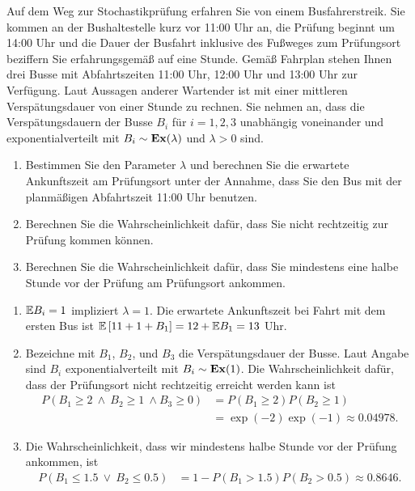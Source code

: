  Auf dem Weg zur Stochastikprüfung erfahren Sie von
einem Busfahrerstreik. Sie kommen an der Bushaltestelle kurz vor 11:00 Uhr an,
die Prüfung beginnt um 14:00 Uhr und die Dauer der Busfahrt inklusive des
Fußweges zum Prüfungsort beziffern Sie erfahrungsgemäß auf eine Stunde. Gemäß
Fahrplan stehen Ihnen drei Busse mit Abfahrtszeiten 11:00 Uhr, 12:00 Uhr und 13:00 Uhr zur
Verfügung. Laut Aussagen anderer Wartender ist mit einer mittleren
Verspätungsdauer von einer Stunde zu rechnen. Sie nehmen an, dass die
Verspätungsdauern der Busse $B_i$  f\"ur $i=1,2,3$ unabhängig voneinander und exponentialverteilt mit $B_i \sim \mathbf{Ex}(\lambda)$ und
$\lambda>0$ sind. 
\begin{enumerate}
    \item Bestimmen Sie den Parameter $\lambda$ und berechnen Sie die erwartete
        Ankunftszeit am Prüfungsort unter der Annahme, dass Sie den Bus mit der
        planmäßigen Abfahrtszeit 11:00 Uhr benutzen.
    \item Berechnen Sie die Wahrscheinlichkeit dafür, dass Sie nicht rechtzeitig 
        zur Prüfung kommen können.
    \item Berechnen Sie die Wahrscheinlichkeit dafür, dass Sie mindestens eine halbe Stunde
        vor der Prüfung am Prüfungsort ankommen.
\end{enumerate}

\solution
\begin{enumerate}
    \item $\mathbb{E} B_i = 1$ impliziert $\lambda=1$. Die erwartete Ankunftszeit bei
        Fahrt mit dem ersten Bus ist $\mathbb{E} \left[ 11 + 1 + B_1  \right] = 12 +
        \mathbb{E} B_1 = 13$ Uhr.
    \item Bezeichne mit $B_1$, $B_2$, und $B_3$ die Verspätungsdauer der Busse.
        Laut Angabe sind $B_i$ exponentialverteilt mit  $B_i \sim
        \mathbf{Ex}(1)$. Die Wahrscheinlichkeit dafür, dass der Prüfungsort nicht
        rechtzeitig erreicht werden kann ist
        \begin{align*}
            P\left( B_1 \geq 2 \ \wedge \ B_2 \geq 1 \ \wedge B_3 \geq 0 \right) &= 
            P(B_1 \geq 2) P(B_2 \geq 1) \\
            &= \exp\left( -2 \right) \exp( -1) \approx 0.04978.
        \end{align*}

    \item Die Wahrscheinlichkeit, dass wir mindestens halbe Stunde vor der
        Prüfung ankommen, ist
        \begin{align*}
            P( B_1 \leq 1.5 \ \vee \ B_2 \leq 0.5  ) &= 1 - P(B_1 > 1.5 )P(B_2 > 0.5) 
            \approx 0.8646. 
        \end{align*}
\end{enumerate}



